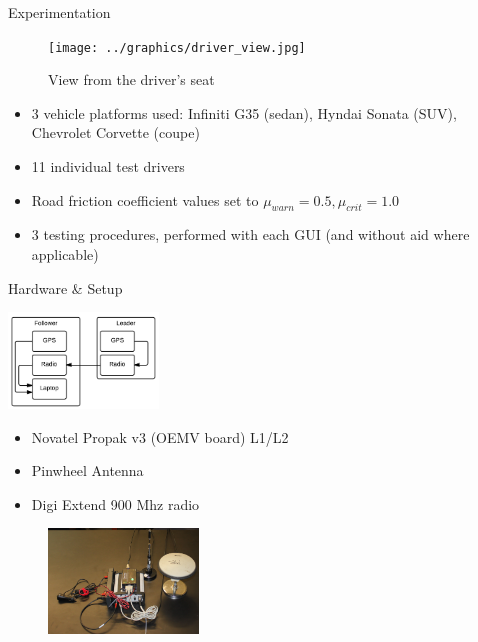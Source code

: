 \documentclass{beamer}
\begin{document}
  \begin{frame}{Experimentation}
    \begin{figure}[ht] \centering
      \texttt{[image: ../graphics/driver\_view.jpg]}
      \caption{\scriptsize View from the driver's seat}
    \end{figure}
    \vspace{-20pt}
    \begin{itemize} \footnotesize
      \item 3 vehicle platforms used: Infiniti G35 (sedan), Hyndai Sonata (SUV), Chevrolet Corvette (coupe)
      \item 11 individual test drivers
      \item Road friction coefficient values set to $\mu_{warn}=0.5,\mu_{crit}=1.0$
      \item 3 testing procedures, performed with each GUI (and without aid where applicable)
    \end{itemize}
  \end{frame}

  \begin{frame}{Hardware \& Setup}
      \begin{minipage}{0.45\textwidth}
        \centering
        \includegraphics[width=4cm]{../graphics/hardware_flow.png}
      \end{minipage}
      \begin{minipage}{0.45\textwidth}
        \begin{itemize}
          \item Novatel Propak v3 (OEMV board) L1/L2
          \item Pinwheel Antenna
          \item Digi Extend 900 Mhz radio
        \end{itemize}
      \end{minipage}
      \begin{figure}
        \includegraphics[width=4cm]{../graphics/lead_hardware.jpg}
      \end{figure}
  \end{frame}
\end{document}
